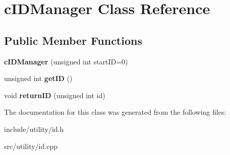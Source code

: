 \hypertarget{classcIDManager}{\section{c\-I\-D\-Manager \-Class \-Reference}
\label{de/dd4/classcIDManager}
}
\subsection*{\-Public \-Member \-Functions}
\begin{DoxyCompactItemize}
\item 
\hypertarget{classcIDManager_a59021595aaf85ebc151c207a8a04f101}{{\bfseries c\-I\-D\-Manager} (unsigned int start\-I\-D=0)}\label{de/dd4/classcIDManager_a59021595aaf85ebc151c207a8a04f101}

\item 
\hypertarget{classcIDManager_a45420147e785cc219743e9aa2c336501}{unsigned int {\bfseries get\-I\-D} ()}\label{de/dd4/classcIDManager_a45420147e785cc219743e9aa2c336501}

\item 
\hypertarget{classcIDManager_a6671d898740f88cf40860b0b9e119b02}{void {\bfseries return\-I\-D} (unsigned int id)}\label{de/dd4/classcIDManager_a6671d898740f88cf40860b0b9e119b02}

\end{DoxyCompactItemize}


\-The documentation for this class was generated from the following files\-:\begin{DoxyCompactItemize}
\item 
include/utility/id.\-h\item 
src/utility/id.\-cpp\end{DoxyCompactItemize}
